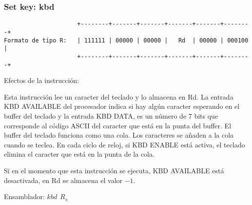 \documentclass[letterpaper,11pt]{scrartcl}
\begin{document}
\subsubsection*{Set key: \textbf{kbd}}

\begin{verbatim}
                     +--------+-------+-------+-------+-------+--------+ 
Formato de tipo R:   | 111111 | 00000 | 00000 |   Rd  | 00000 | 000100 | 
                     +--------+-------+-------+-------+-------+--------+ 
\end{verbatim}

Efectos de la instrucción: 

Esta instrucción lee un caracter del teclado y lo almacena en Rd.
La entrada KBD AVAILABLE del procesador indica si hay algún caracter
esperando en el buffer del teclado y la entrada KBD DATA, es un número
de 7 bits que corresponde al código ASCII del caracter que está en
la punta del buffer. El buffer del teclado funciona como una cola.
Los caracteres se añaden a la cola cuando se teclea.
En cada ciclo de reloj, si KBD ENABLE está activa, el teclado elimina
el caracter que está en la punta de la cola.

Si en el momento que esta instrucción se ejecuta, KBD AVAILABLE está
desactivada, en Rd se almacena el valor $-1$.

Ensamblador: $kbd\hspace{5pt}R_s$





\end{document}
